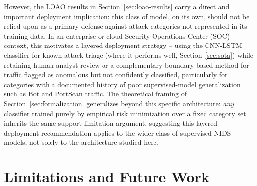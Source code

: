 \documentclass[11pt]{article}
\begin{document}
However, the LOAO results in Section~\ref{sec:loao-results} carry a direct and important deployment
implication: this class of model, on its own, should not be relied upon as a primary defense against
attack categories not represented in its training data. In an enterprise or cloud Security Operations
Center (SOC) context, this motivates a layered deployment strategy -- using the CNN-LSTM classifier
for known-attack triage (where it performs well, Section~\ref{sec:sota}) while retaining human
analyst review or a complementary boundary-based method for traffic flagged as anomalous but not
confidently classified, particularly for categories with a documented history of poor
supervised-model generalization such as Bot and PortScan traffic. The theoretical framing of
Section~\ref{sec:formalization} generalizes beyond this specific architecture: \emph{any} classifier
trained purely by empirical risk minimization over a fixed category set inherits the same
support-limitation argument, suggesting this layered-deployment recommendation applies to the wider
class of supervised NIDS models, not solely to the architecture studied here.

\section{Limitations and Future Work}
\label{sec:limitations}
\end{document}
